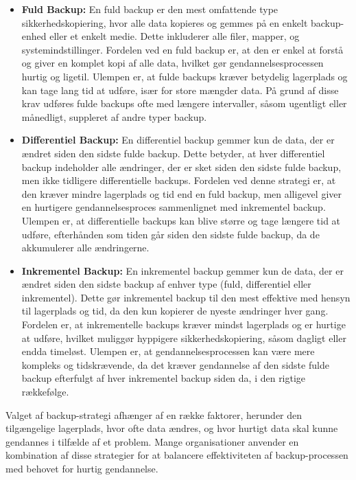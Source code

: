 \begin{itemize}
	\item \textbf{Fuld Backup:} En fuld backup er den mest omfattende type sikkerhedskopiering, hvor alle data kopieres og gemmes på en enkelt backup-enhed eller et enkelt medie. Dette inkluderer alle filer, mapper, og systemindstillinger. Fordelen ved en fuld backup er, at den er enkel at forstå og giver en komplet kopi af alle data, hvilket gør gendannelsesprocessen hurtig og ligetil. Ulempen er, at fulde backups kræver betydelig lagerplads og kan tage lang tid at udføre, især for store mængder data. På grund af disse krav udføres fulde backups ofte med længere intervaller, såsom ugentligt eller månedligt, suppleret af andre typer backup.
	
	\item \textbf{Differentiel Backup:} En differentiel backup gemmer kun de data, der er ændret siden den sidste fulde backup. Dette betyder, at hver differentiel backup indeholder alle ændringer, der er sket siden den sidste fulde backup, men ikke tidligere differentielle backups. Fordelen ved denne strategi er, at den kræver mindre lagerplads og tid end en fuld backup, men alligevel giver en hurtigere gendannelsesproces sammenlignet med inkrementel backup. Ulempen er, at differentielle backups kan blive større og tage længere tid at udføre, efterhånden som tiden går siden den sidste fulde backup, da de akkumulerer alle ændringerne.
	
	\item \textbf{Inkrementel Backup:} En inkrementel backup gemmer kun de data, der er ændret siden den sidste backup af enhver type (fuld, differentiel eller inkrementel). Dette gør inkrementel backup til den mest effektive med hensyn til lagerplads og tid, da den kun kopierer de nyeste ændringer hver gang. Fordelen er, at inkrementelle backups kræver mindst lagerplads og er hurtige at udføre, hvilket muliggør hyppigere sikkerhedskopiering, såsom dagligt eller endda timeløst. Ulempen er, at gendannelsesprocessen kan være mere kompleks og tidskrævende, da det kræver gendannelse af den sidste fulde backup efterfulgt af hver inkrementel backup siden da, i den rigtige rækkefølge.
	
\end{itemize}
\noindent
Valget af backup-strategi afhænger af en række faktorer, herunder den tilgængelige lagerplads, hvor ofte data ændres, og hvor hurtigt data skal kunne gendannes i tilfælde af et problem. Mange organisationer anvender en kombination af disse strategier for at balancere effektiviteten af backup-processen med behovet for hurtig gendannelse.


